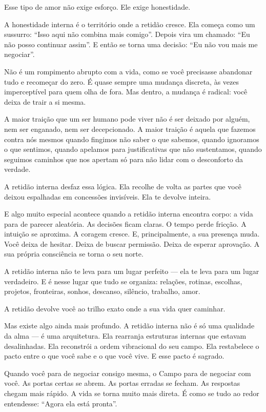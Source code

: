 \documentclass[12pt]{book}
\begin{document}
Esse tipo de amor não exige esforço. Ele exige honestidade.

A honestidade interna é o território onde a retidão cresce. Ela começa como um sussurro: “Isso aqui não combina mais comigo”. Depois vira um chamado: “Eu não posso continuar assim”. E então se torna uma decisão: “Eu não vou mais me negociar”.

Não é um rompimento abrupto com a vida, como se você precisasse abandonar tudo e recomeçar do zero. É quase sempre uma mudança discreta, às vezes imperceptível para quem olha de fora. Mas dentro, a mudança é radical: você deixa de trair a si mesma.

A maior traição que um ser humano pode viver não é ser deixado por alguém, nem ser enganado, nem ser decepcionado. A maior traição é aquela que fazemos contra nós mesmos quando fingimos não saber o que sabemos, quando ignoramos o que sentimos, quando apelamos para justificativas que não sustentamos, quando seguimos caminhos que nos apertam só para não lidar com o desconforto da verdade.

A retidão interna desfaz essa lógica. Ela recolhe de volta as partes que você deixou espalhadas em concessões invisíveis. Ela te devolve inteira.

E algo muito especial acontece quando a retidão interna encontra corpo: a vida para de parecer aleatória. As decisões ficam claras. O tempo perde fricção. A intuição se aproxima. A coragem cresce. E, principalmente, a sua presença muda. Você deixa de hesitar. Deixa de buscar permissão. Deixa de esperar aprovação. A sua própria consciência se torna o seu norte.

A retidão interna não te leva para um lugar perfeito — ela te leva para um lugar verdadeiro. E é nesse lugar que tudo se organiza: relações, rotinas, escolhas, projetos, fronteiras, sonhos, descanso, silêncio, trabalho, amor.

A retidão devolve você ao trilho exato onde a sua vida quer caminhar.

Mas existe algo ainda mais profundo. A retidão interna não é só uma qualidade da alma — é uma arquitetura. Ela rearranja estruturas internas que estavam desalinhadas. Ela reconstrói a ordem vibracional do seu campo. Ela restabelece o pacto entre o que você sabe e o que você vive. E esse pacto é sagrado.

Quando você para de negociar consigo mesma, o Campo para de negociar com você. As portas certas se abrem. As portas erradas se fecham. As respostas chegam mais rápido. A vida se torna muito mais direta. É como se tudo ao redor entendesse: “Agora ela está pronta”.
\end{document}
